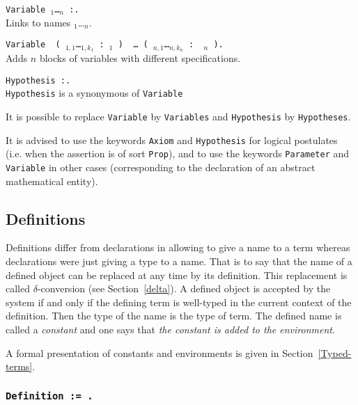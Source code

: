 \begin{Variants}
\item {\tt Variable {\ident$_1$}\ldots{\ident$_n$} {\tt :}{\term}.}\\
  Links {\term} to names {\ident$_1$}\ldots{\ident$_n$}.
\item
 {\tt Variable\,%
(\,{\ident$_{1,1}$}\ldots{\ident$_{1,k_1}$}\,{\tt :}\,{\term$_1$} {\tt )}\,%
\ldots\,{\tt (}\,{\ident$_{n,1}$}\ldots{\ident$_{n,k_n}$}\,{\tt :}\,%
{\term$_n$} {\tt )}.}\\ 
  Adds $n$ blocks of variables with different specifications.
\item {\tt Hypothesis {\ident} {\tt :}{\term}.} \\
  \texttt{Hypothesis} is a synonymous of \texttt{Variable}
\end{Variants}

 It is possible to replace {\tt Variable} by
{\tt Variables} and {\tt Hypothesis} by {\tt Hypotheses}.

It is advised to use the keywords \verb:Axiom: and \verb:Hypothesis:
for logical postulates (i.e. when the assertion {\term} is of sort
\verb:Prop:), and to use the keywords \verb:Parameter: and
\verb:Variable: in other cases (corresponding to the declaration of an
abstract mathematical entity).

\subsection{Definitions
\label{Simpl-definitions}}

Definitions differ from declarations in allowing to give a name to a
term whereas declarations were just giving a type to a name. That is
to say that the name of a defined object can be replaced at any time
by its definition.  This replacement is called
$\delta$-conversion (see
Section~\ref{delta}).  A defined object is accepted by the system if
and only if the defining term is well-typed in the current context of
the definition.  Then the type of the name is the type of term. The
defined name is called a {\em constant} and one says
that {\it the constant is added to the
environment}.

A formal presentation of constants and environments is given in
Section~\ref{Typed-terms}.

\subsubsection{\tt Definition {\ident} := {\term}.
}

